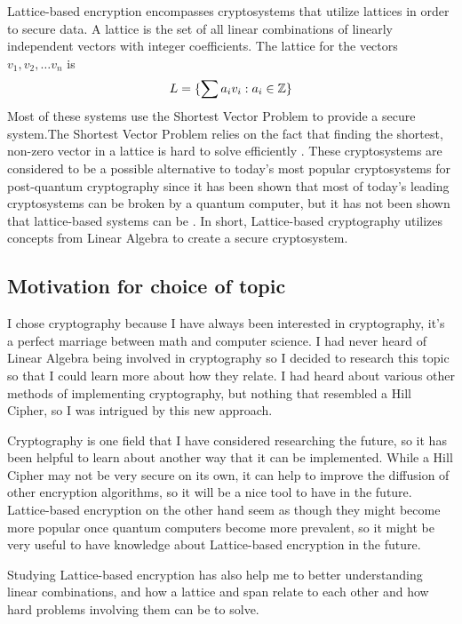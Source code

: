 \documentclass{../mathhomework}
\begin{document}
Lattice-based encryption encompasses cryptosystems that utilize lattices in order to secure data. A lattice is the set of all linear combinations of
linearly independent vectors with integer coefficients. The lattice for the vectors $v_1, v_2, \ldots v_n$ is
\begin{equation*}
    L = \{\sum a_iv_i: a_i \in \mathbb{Z}\}
\end{equation*}
Most of these systems use the Shortest Vector Problem to provide a secure system.The Shortest Vector Problem relies on the 
fact that finding the shortest, non-zero vector in a lattice is hard to solve efficiently \cite{ajtai98}. These 
cryptosystems are considered to be a possible alternative to today's most popular cryptosystems for post-quantum 
cryptography since it has been shown that most of today’s leading cryptosystems can be broken by a quantum 
computer, but it has not been shown that lattice-based systems can be \cite{micciancio08}. In short, Lattice-based
cryptography utilizes concepts from Linear Algebra to create a secure cryptosystem.



\subsection{Motivation for choice of topic}

I chose cryptography because I have always been interested in cryptography, it's a perfect marriage between
math and computer science. I had never heard of Linear Algebra being involved in cryptography so I decided to
research this topic so that I could learn more about how they relate. I had heard about various other methods
of implementing cryptography, but nothing that resembled a Hill Cipher, so I was intrigued by this new approach.

Cryptography is one field that I have considered researching the future, so it has been helpful to learn about
another way that it can be implemented. While a Hill Cipher may not be very secure on its own, it can help to
improve the diffusion of other encryption algorithms, so it will be a nice tool to have in the future. 
Lattice-based encryption on the other hand seem as though they might become more popular once quantum computers
become more prevalent, so it might be very useful to have knowledge about Lattice-based encryption in the future.

Studying Lattice-based encryption has also help me to better understanding linear combinations, and how a lattice
and span relate to each other and how hard problems involving them can be to solve.
\end{document}
